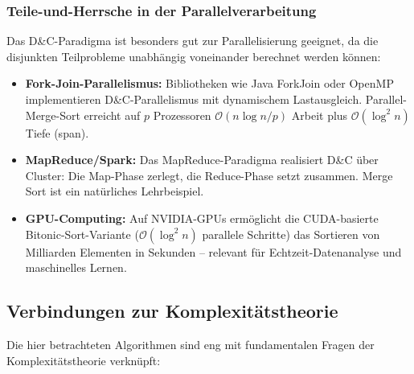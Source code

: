 ﻿\documentclass[a4paper,12pt]{article}
\theoremstyle{definition}
\begin{document}
\subsubsection{Teile-und-Herrsche in der Parallelverarbeitung}

Das D\&C-Paradigma ist besonders gut zur Parallelisierung geeignet, da die
disjunkten Teilprobleme unabhängig voneinander berechnet werden können:

\begin{itemize}
    \item \textbf{Fork-Join-Parallelismus:} Bibliotheken wie Java ForkJoin
          oder OpenMP implementieren D\&C-Parallelismus mit dynamischem
          Lastausgleich. Parallel-Merge-Sort erreicht auf $p$ Prozessoren
          $\mathcal{O}(n \log n / p)$ Arbeit plus $\mathcal{O}(\log^2 n)$
          Tiefe (span).
    \item \textbf{MapReduce/Spark:} Das MapReduce-Paradigma \cite{dean2008}
          realisiert D\&C über Cluster: Die Map-Phase zerlegt, die Reduce-Phase
          setzt zusammen. Merge Sort ist ein natürliches Lehrbeispiel.
    \item \textbf{GPU-Computing:} Auf NVIDIA-GPUs ermöglicht die CUDA-basierte
          Bitonic-Sort-Variante ($\mathcal{O}(\log^2 n)$ parallele Schritte)
          das Sortieren von Milliarden Elementen in Sekunden -- relevant für
          Echtzeit-Datenanalyse und maschinelles Lernen.
\end{itemize}

\subsection{Verbindungen zur Komplexitätstheorie}

Die hier betrachteten Algorithmen sind eng mit fundamentalen Fragen der
Komplexitätstheorie verknüpft:
\end{document}
